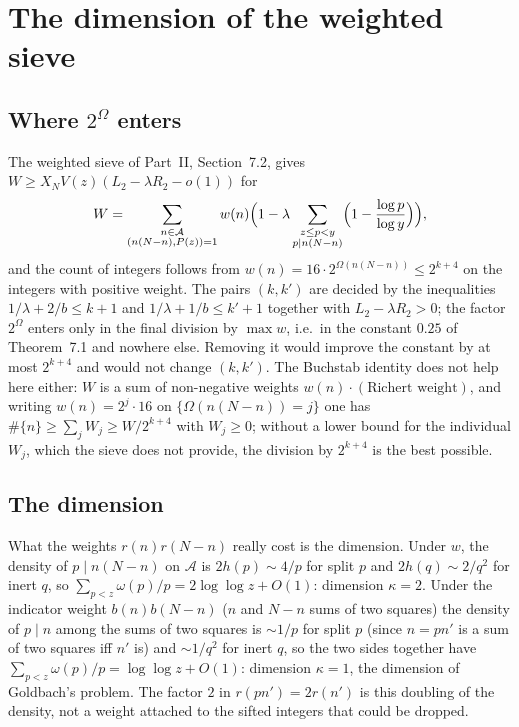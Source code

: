 \documentclass[11pt,a4paper]{article}
\theoremstyle{remark}
\theoremstyle{definition}
\newcommand{\cA}{\mathcal A}
\begin{document}
\section{The dimension of the weighted sieve}

\subsection{Where $2^{\Omega}$ enters}
The weighted sieve of Part~II, Section~7.2, gives $W\ge X_NV(z)(L_2-\lambda R_2-o(1))$ for
\[
W=\sum_{\substack{n\in\cA\\ (n(N-n),P(z))=1}}w(n)\Bigl(1-\lambda\sum_{\substack{z\le p<y\\ p\mid n(N-n)}}\Bigl(1-\frac{\log p}{\log y}\Bigr)\Bigr),
\]
and the count of integers follows from $w(n)=16\cdot2^{\Omega(n(N-n))}\le2^{k+4}$ on the integers with positive weight. The pairs $(k,k')$ are decided by the inequalities $1/\lambda+2/b\le k+1$ and $1/\lambda+1/b\le k'+1$ together with $L_2-\lambda R_2>0$; the factor $2^{\Omega}$ enters only in the final division by $\max w$, i.e.\ in the constant $0.25$ of Theorem~7.1 and nowhere else. Removing it would improve the constant by at most $2^{k+4}$ and would not change $(k,k')$. The Buchstab identity does not help here either: $W$ is a sum of non-negative weights $w(n)\cdot(\text{Richert weight})$, and writing $w(n)=2^{j}\cdot16$ on $\{\Omega(n(N-n))=j\}$ one has $\#\{n\}\ge\sum_jW_j\ge W/2^{k+4}$ with $W_j\ge0$; without a lower bound for the individual $W_j$, which the sieve does not provide, the division by $2^{k+4}$ is the best possible.

\subsection{The dimension}
What the weights $r(n)r(N-n)$ really cost is the dimension. Under $w$, the density of $p\mid n(N-n)$ on $\cA$ is $2h(p)\sim4/p$ for split $p$ and $2h(q)\sim2/q^2$ for inert $q$, so $\sum_{p<z}\omega(p)/p=2\log\log z+O(1)$: dimension $\kappa=2$. Under the indicator weight $b(n)b(N-n)$ ($n$ and $N-n$ sums of two squares) the density of $p\mid n$ among the sums of two squares is $\sim1/p$ for split $p$ (since $n=pn'$ is a sum of two squares iff $n'$ is) and $\sim1/q^2$ for inert $q$, so the two sides together have $\sum_{p<z}\omega(p)/p=\log\log z+O(1)$: dimension $\kappa=1$, the dimension of Goldbach's problem. The factor $2$ in $r(pn')=2r(n')$ is this doubling of the density, not a weight attached to the sifted integers that could be dropped.
\end{document}
